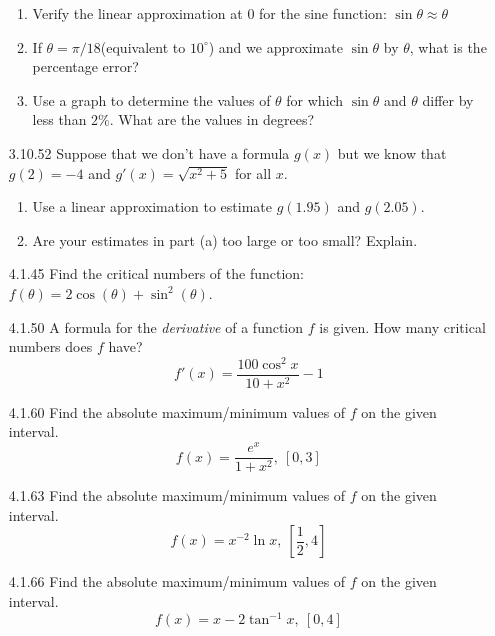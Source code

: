 \documentclass{article}
\begin{document}
\begin{enumerate}
    \begin{enumerate}
        \item
            Verify the linear approximation at $0$ for the sine function:
            $\displaystyle  \sin  \theta   \approx \theta $
        \item
            If $ \theta = \pi / 18$(equivalent to $10^{\circ}$) and we
            approximate $\sin  \theta   $ by $ \theta $,
            what is the percentage error?
        \item
            Use a graph to determine the values of $ \theta $ for which $ \sin  \theta  $
            and $ \theta $ differ by less than $2\%$.  What are the values in degrees?
    \end{enumerate}

\vspace{7cm}

\item[3.10.52]
    Suppose that we don't have a formula $g(x)$ but we know that
    $g(2) = -4$ and $g'(x) = \sqrt{x^{2} + 5}$ for all $x$.
    \begin{enumerate}
        \item
            Use a linear approximation to estimate $g(1.95)$ and $g(2.05)$.
        \item
            Are your estimates in part (a) too large or too small? Explain.
    \end{enumerate}

\newpage

\item[4.1.45]
    Find the critical numbers of the function: $f( \theta  ) = 2 \cos ( \theta  ) + \sin^{2} ( \theta  )  $.

\vspace{6cm}

\item[4.1.50]
    A formula for the \textit{derivative} of a function $f$ is given. How many critical
    numbers does $f$ have?
    \[
        f'(x) = \frac{100 \cos^{2}x}{10 + x^{2}} - 1
    \]

\vspace{6cm}

\item[4.1.60]
    Find the absolute maximum/minimum values of $f$ on the given interval.
    \[
        f(x) = \frac{e^{x}}{1 + x^{2}},\ [0, 3]
    \]

\newpage

\item[4.1.63]
    Find the absolute maximum/minimum values of $f$ on the given interval.
    \[
        f(x) = x^{-2} \ln x,\ \left[\frac{1}{2}, 4\right]
    \]

\vspace{6cm}


\item[4.1.66]
    Find the absolute maximum/minimum values of $f$ on the given interval.
    \[
        f(x) = x - 2 \tan^{-1} x,\ [0, 4]
    \]


\end{enumerate}
\end{document}
